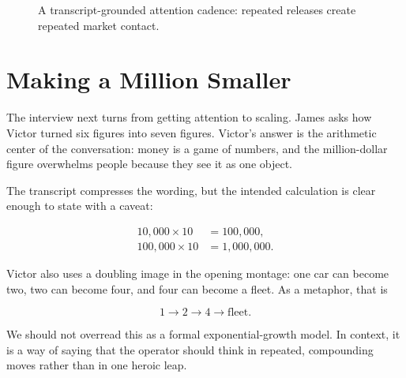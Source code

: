 \begin{figure}[h]
\centering
{}
\caption{A transcript-grounded attention cadence: repeated releases create repeated market contact.}
\end{figure}

\section{Making a Million Smaller}

The interview next turns from getting attention to scaling. James asks how Victor turned six figures into seven figures. Victor's answer is the arithmetic center of the conversation: money is a game of numbers, and the million-dollar figure overwhelms people because they see it as one object.

The transcript compresses the wording, but the intended calculation is clear enough to state with a caveat:

\begin{align}
10{,}000 \times 10 &= 100{,}000, \\
100{,}000 \times 10 &= 1{,}000{,}000.
\end{align}

Victor also uses a doubling image in the opening montage: one car can become two, two can become four, and four can become a fleet. As a metaphor, that is

\begin{equation}
1 \longrightarrow 2 \longrightarrow 4 \longrightarrow \text{fleet}.
\end{equation}

We should not overread this as a formal exponential-growth model. In context, it is a way of saying that the operator should think in repeated, compounding moves rather than in one heroic leap.

